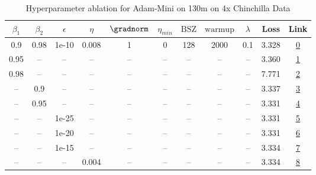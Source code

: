 \begin{table}[H]
\centering
\caption{Hyperparameter ablation for Adam-Mini on 130m on 4x Chinchilla Data}
\label{tab:ablation_adam-mini_130m_on_4x_chinchilla_data}
\begin{tabular}{ccccccccccc}
\toprule
$\beta_1$ & $\beta_2$ & $\epsilon$ & $\eta$ & $\gradnorm$ & $\eta_{min}$ & $\mathrm{BSZ}$ & $\mathrm{warmup}$ & $\lambda$ & Loss & Link \\
\midrule
0.9 & 0.98 & 1e-10 & 0.008 & 1 & 0 & 128 & 2000 & 0.1 & 3.328 & \href{https://wandb.ai/stanford-mercury/optimizer-scaling/runs/sweep-130m-10B-mini8e0689lr0.008-wd0.1-minlr0-warmup2000-b10.9-b-1de787}{0} \\
\midrule
0.95 & -- & -- & -- & -- & -- & -- & -- & -- & 3.360 & \href{https://wandb.ai/stanford-mercury/optimizer-scaling/runs/sweep-130m-10B-mini5655falr0.008-wd0.1-minlr0-warmup2000-b10.95--7977a5}{1} \\
0.98 & -- & -- & -- & -- & -- & -- & -- & -- & 7.771 & \href{https://wandb.ai/stanford-mercury/optimizer-scaling/runs/sweep-130m-10B-mini608e8clr0.008-wd0.1-minlr0-warmup2000-b10.98--851955}{2} \\
-- & 0.9 & -- & -- & -- & -- & -- & -- & -- & 3.337 & \href{https://wandb.ai/stanford-mercury/optimizer-scaling/runs/sweep-130m-10B-minic61cb4lr0.008-wd0.1-minlr0-warmup2000-b10.9-b-3daee1}{3} \\
-- & 0.95 & -- & -- & -- & -- & -- & -- & -- & 3.331 & \href{https://wandb.ai/stanford-mercury/optimizer-scaling/runs/sweep-130m-10B-minica3b57lr0.008-wd0.1-minlr0-warmup2000-b10.9-b-c56f5e}{4} \\
-- & -- & 1e-25 & -- & -- & -- & -- & -- & -- & 3.331 & \href{https://wandb.ai/stanford-mercury/optimizer-scaling/runs/sweep-130m-10B-mini98f892lr0.008-wd0.1-minlr0-warmup2000-b10.9-b-b90941}{5} \\
-- & -- & 1e-20 & -- & -- & -- & -- & -- & -- & 3.331 & \href{https://wandb.ai/stanford-mercury/optimizer-scaling/runs/sweep-130m-10B-mini3af704lr0.008-wd0.1-minlr0-warmup2000-b10.9-b-522688}{6} \\
-- & -- & 1e-15 & -- & -- & -- & -- & -- & -- & 3.334 & \href{https://wandb.ai/stanford-mercury/optimizer-scaling/runs/sweep-130m-10B-mini99be6blr0.008-wd0.1-minlr0-warmup2000-b10.9-b-c9b783}{7} \\
-- & -- & -- & 0.004 & -- & -- & -- & -- & -- & 3.334 & \href{https://wandb.ai/stanford-mercury/optimizer-scaling/runs/sweep-130m-10B-mini593d31lr0.004-wd0.1-minlr0-warmup2000-b10.9-b-17e1ff}{8} \\

\end{tabular}
\end{table}
